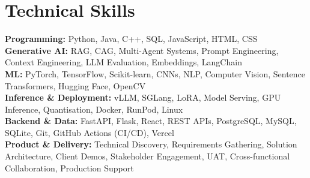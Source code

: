 \documentclass[10pt,a4paper]{extarticle}
\begin{document}
\section{Technical Skills}
\textbf{Programming:} Python, Java, C++, SQL, JavaScript, HTML, CSS\\
\textbf{Generative AI:} RAG, CAG, Multi-Agent Systems, Prompt Engineering, Context Engineering, LLM Evaluation, Embeddings, LangChain\\
\textbf{ML:} PyTorch, TensorFlow, Scikit-learn, CNNs, NLP, Computer Vision, Sentence Transformers, Hugging Face, OpenCV\\
\textbf{Inference \& Deployment:} vLLM, SGLang, LoRA, Model Serving, GPU Inference, Quantisation, Docker, RunPod, Linux\\
\textbf{Backend \& Data:} FastAPI, Flask, React, REST APIs, PostgreSQL, MySQL, SQLite, Git, GitHub Actions (CI/CD), Vercel\\
\textbf{Product \& Delivery:} Technical Discovery, Requirements Gathering, Solution Architecture, Client Demos, Stakeholder Engagement, UAT, Cross-functional Collaboration, Production Support
\end{document}
